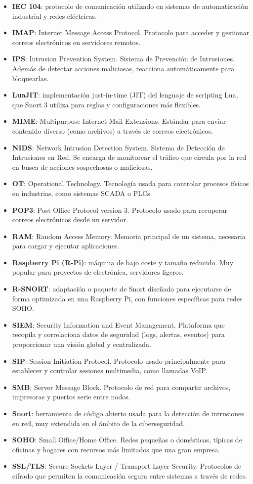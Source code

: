\documentclass[12pt,a4paper]{report}
\begin{document}
\begin{itemize}
	\item \textbf{IEC 104}: protocolo de comunicación utilizado en sistemas de automatización industrial y redes eléctricas.
	\item \textbf{IMAP}: Internet Message Access Protocol. Protocolo para acceder y gestionar correos electrónicos en servidores remotos.
	\item \textbf{IPS}: Intrusion Prevention System. Sistema de Prevención de Intrusiones. Además de detectar acciones maliciosas, reacciona automáticamente para bloquearlas.
	\item \textbf{LuaJIT}: implementación just-in-time (JIT) del lenguaje de scripting Lua, que Snort 3 utiliza para reglas y configuraciones más flexibles.
	\item \textbf{MIME}: Multipurpose Internet Mail Extensions. Estándar para enviar contenido diverso (como archivos) a través de correos electrónicos.
	\item \textbf{NIDS}: Network Intrusion Detection System. Sistema de Detección de Intrusiones en Red. Se encarga de monitorear el tráfico que circula por la red en busca de acciones sospechosas o maliciosas.
	\item \textbf{OT}: Operational Technology. Tecnología usada para controlar procesos físicos en industrias, como sistemas SCADA o PLCs.
	\item \textbf{POP3}: Post Office Protocol version 3. Protocolo usado para recuperar correos electrónicos desde un servidor.
	\item \textbf{RAM}: Random Access Memory. Memoria principal de un sistema, necesaria para cargar y ejecutar aplicaciones.
	\item \textbf{Raspberry Pi (R-Pi)}: máquina de bajo coste y tamaño reducido. Muy popular para proyectos de electrónica, servidores ligeros.
	\item \textbf{R-SNORT}: adaptación o paquete de Snort diseñado para ejecutarse de forma optimizada en una Raspberry Pi, con funciones específicas para redes SOHO.
	\item \textbf{SIEM}: Security Information and Event Management. Plataforma que recopila y correlaciona datos de seguridad (logs, alertas, eventos) para proporcionar una visión global y centralizada.
	\item \textbf{SIP}: Session Initiation Protocol. Protocolo usado principalmente para establecer y controlar sesiones multimedia, como llamadas VoIP.
	\item \textbf{SMB}: Server Message Block. Protocolo de red para compartir archivos, impresoras y puertos serie entre nodos.
	\item \textbf{Snort}: herramienta de código abierto usada para la detección de intrusiones en red, muy extendida en el ámbito de la ciberseguridad.
	\item \textbf{SOHO}: Small Office/Home Office. Redes pequeñas o domésticas, típicas de oficinas y hogares con recursos más limitados que una gran empresa.
	\item \textbf{SSL/TLS}: Secure Sockets Layer / Transport Layer Security. Protocolos de cifrado que permiten la comunicación segura entre sistemas a través de redes.
\end{itemize}
\end{document}
